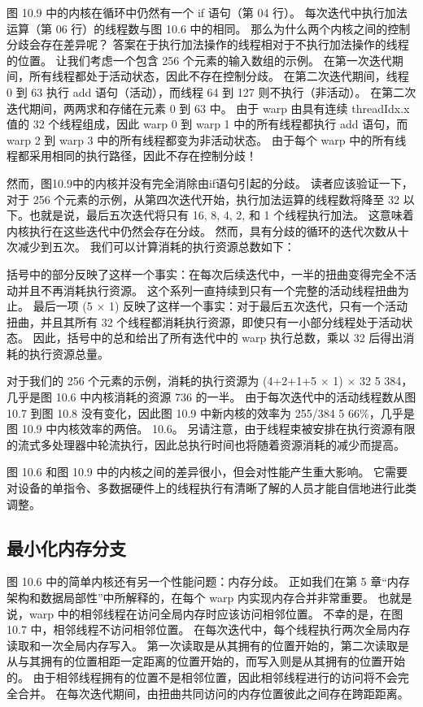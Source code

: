 图 10.9 中的内核在循环中仍然有一个 if 语句（第 04 行）。 每次迭代中执行加法运算（第 06 行）的线程数与图 10.6 中的相同。 那么为什么两个内核之间的控制分歧会存在差异呢？ 答案在于执行加法操作的线程相对于不执行加法操作的线程的位置。 让我们考虑一个包含 256 个元素的输入数组的示例。 在第一次迭代期间，所有线程都处于活动状态，因此不存在控制分歧。 在第二次迭代期间，线程 0 到 63 执行 add 语句（活动），而线程 64 到 127 则不执行（非活动）。 在第二次迭代期间，两两求和存储在元素 0 到 63 中。 由于 warp 由具有连续 threadIdx.x 值的 32 个线程组成，因此 warp 0 到 warp 1 中的所有线程都执行 add 语句，而 warp 2 到 warp 3 中的所有线程都变为非活动状态。 由于每个 warp 中的所有线程都采用相同的执行路径，因此不存在控制分歧！

然而，图10.9中的内核并没有完全消除由if语句引起的分歧。 读者应该验证一下，对于 256 个元素的示例，从第四次迭代开始，执行加法运算的线程数将降至 32 以下。也就是说，最后五次迭代将只有 16, 8, 4, 2, 和 1 个线程执行加法。 这意味着内核执行在这些迭代中仍然会存在分歧。 然而，具有分歧的循环的迭代次数从十次减少到五次。 我们可以计算消耗的执行资源总数如下：

括号中的部分反映了这样一个事实：在每次后续迭代中，一半的扭曲变得完全不活动并且不再消耗执行资源。 这个系列一直持续到只有一个完整的活动线程扭曲为止。 最后一项 (5 × 1) 反映了这样一个事实：对于最后五次迭代，只有一个活动扭曲，并且其所有 32 个线程都消耗执行资源，即使只有一小部分线程处于活动状态。 因此，括号中的总和给出了所有迭代中的 warp 执行总数，乘以 32 后得出消耗的执行资源总量。

对于我们的 256 个元素的示例，消耗的执行资源为 (4+2+1+5 × 1) × 32 5 384，几乎是图 10.6 中内核消耗的资源 736 的一半。 由于每次迭代中的活动线程数从图 10.7 到图 10.8 没有变化，因此图 10.9 中新内核的效率为 255/384 5 66\%，几乎是图 10.9 中内核效率的两倍。 10.6。 另请注意，由于线程束被安排在执行资源有限的流式多处理器中轮流执行，因此总执行时间也将随着资源消耗的减少而提高。

图 10.6 和图 10.9 中的内核之间的差异很小，但会对性能产生重大影响。 它需要对设备的单指令、多数据硬件上的线程执行有清晰了解的人员才能自信地进行此类调整。

\subsection{最小化内存分支}
图 10.6 中的简单内核还有另一个性能问题：内存分歧。 正如我们在第 5 章“内存架构和数据局部性”中所解释的，在每个 warp 内实现内存合并非常重要。 也就是说，warp 中的相邻线程在访问全局内存时应该访问相邻位置。 不幸的是，在图 10.7 中，相邻线程不访问相邻位置。 在每次迭代中，每个线程执行两次全局内存读取和一次全局内存写入。 第一次读取是从其拥有的位置开始的，第二次读取是从与其拥有的位置相距一定距离的位置开始的，而写入则是从其拥有的位置开始的。 由于相邻线程拥有的位置不是相邻位置，因此相邻线程进行的访问将不会完全合并。 在每次迭代期间，由扭曲共同访问的内存位置彼此之间存在跨距距离。

